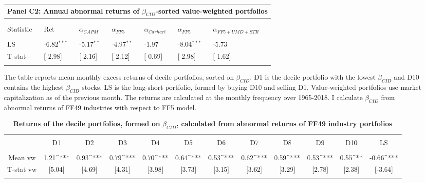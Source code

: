 \documentclass[12pt]{article}
\begin{document}
\begin{table}[!htbp]
\begin{tabularx}{\linewidth}{p{2cm}p{2cm}p{2cm}p{2cm}p{2cm}p{2cm}p{2cm}}
    \toprule
    \multicolumn{7}{l}{\textbf{Panel C2: Annual abnormal returns of $\beta_{CID}$-sorted value-weighted portfolios}} \\
    \midrule
\\[-1.8ex]\hline 
\hline \\[-1.8ex] 
Statistic & Ret & $\alpha_{CAPM}$ & $\alpha_{FF3}$ & $\alpha_{Carhart}$ & $\alpha_{FF5}$ & $\alpha_{FF5+UMD+STR}$ \\ 
\hline \\[-1.8ex] 
LS & -6.82$^{***}$ & -5.17$^{**}$ & -4.97$^{**}$ & -1.97 & -8.04$^{***}$ & -5.73 \\ 
T-stat & [-2.98] & [-2.16] & [-2.12] & [-0.69] & [-2.98] & [-1.62] \\  
\hline \\[-1.8ex] 
\end{tabularx} 

\end{table} 


\begin{table}[!htbp] \centering 
  \caption{\textbf{Returns of the decile portfolios, formed on $\beta_{CID}$, calculated from abnormal returns of FF49 industry portfolios}} 
  \label{} 
    \begin{flushleft}
    {\medskip\small
 The table reports mean monthly excess returns of decile portfolios, sorted on $\beta_{CID}$. D1 is the decile portfolio with the lowest $\beta_{CID}$ and D10 contains the highest $\beta_{CID}$ stocks. LS is the long-short portfolio, formed by buying D10 and selling D1. Value-weighted portfolios use market capitalization as of the previous month. The returns are calculated at the monthly frequency over 1965-2018. I calculate $\beta_{CID}$ from abnormal returns of FF49 industries with respect to FF5 model.}
    \medskip
    \end{flushleft}
\begin{tabular}{@{\extracolsep{-3pt}} cccccccccccc} 
\\[-1.8ex]\hline 
\hline \\[-1.8ex] 
 & D1 & D2 & D3 & D4 & D5 & D6 & D7 & D8 & D9 & D10 & LS \\ 
\hline \\[-1.8ex] 
Mean vw & 1.21^{***} & 0.93^{***} & 0.79^{***} & 0.70^{***} & 0.64^{***} & 0.53^{***} & 0.62^{***} & 0.59^{***} & 0.53^{***} & 0.55^{**} & -0.66^{***} \\ 
T-stat vw & [5.04] & [4.69] & [4.31] & [3.98] & [3.73] & [3.15] & [3.62] & [3.29] & [2.78] & [2.38] & [-3.64] \\ 
\hline \\[-1.8ex] 
\end{tabular} 
\end{table}
\end{document}
